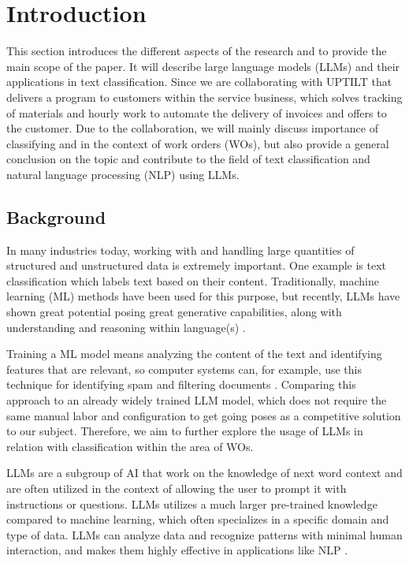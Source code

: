 \section{Introduction}

This section introduces the different aspects of the research and to provide the
main scope of the paper.
It will describe large language models (LLMs) and their applications in text
classification.
Since we are collaborating with UPTILT that delivers a program to customers
within the service business, which solves tracking of materials and hourly
work to automate the delivery of invoices and offers to the customer.
Due to the collaboration, we will mainly discuss importance of classifying
and in the context of work orders (WOs), but also provide a general conclusion
on the topic and contribute to the field of text classification and natural
language processing (NLP) using LLMs.

\subsection{Background}

In many industries today, working with and handling large quantities of
structured and unstructured data is extremely important.
One example is text classification which labels text based on their content.
Traditionally, machine learning (ML) methods have been used for this purpose,
but recently, LLMs have shown great potential posing great generative
capabilities, along with understanding and reasoning within language(s)
\cite{huang2024} \cite{zhang2024}.

Training a ML model means analyzing the content of the text and identifying
features that are relevant, so computer systems can, for example, use this
technique for identifying spam and filtering documents \cite{dalal2011}.
Comparing this approach to an already widely trained LLM model, which does not
require the same manual labor and configuration to get going poses as a
competitive solution to our subject.
Therefore, we aim to further explore the usage of LLMs in relation with
classification within the area of WOs.

LLMs are a subgroup of AI that work on the knowledge of next word context and
are often utilized in the context of allowing the user to prompt it with
instructions or questions.
LLMs utilizes a much larger pre-trained knowledge compared to machine learning,
which often specializes in a specific domain and type of data.
LLMs can analyze data and recognize patterns with minimal human interaction,
and makes them highly effective in applications like NLP \cite{andersson2024}.

